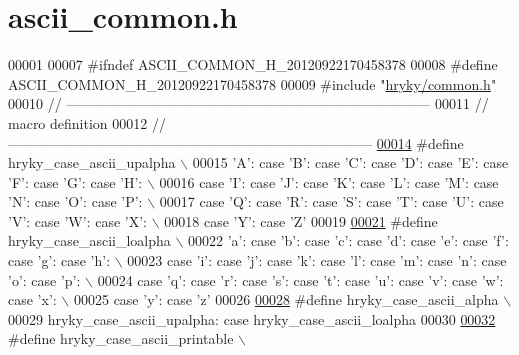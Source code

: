 \hypertarget{ascii__common_8h_source}{\section{ascii\-\_\-common.\-h}
}

\begin{DoxyCode}
00001 
00007 \textcolor{preprocessor}{#ifndef ASCII\_COMMON\_H\_20120922170458378}
00008 \textcolor{preprocessor}{}\textcolor{preprocessor}{#define ASCII\_COMMON\_H\_20120922170458378}
00009 \textcolor{preprocessor}{}\textcolor{preprocessor}{#include "\hyperlink{common_8h}{hryky/common.h}"}
00010 \textcolor{comment}{//
      ------------------------------------------------------------------------------}
00011 \textcolor{comment}{// macro definition}
00012 \textcolor{comment}{//
      ------------------------------------------------------------------------------}
\hypertarget{ascii__common_8h_source_l00014}{}\hyperlink{ascii__common_8h_af55d335795d0ce4ac4d3ab957caa9c09}{00014} \textcolor{comment}{}\textcolor{preprocessor}{#define hryky\_case\_ascii\_upalpha \(\backslash\)}
00015 \textcolor{preprocessor}{    'A': case 'B': case 'C': case 'D': case 'E': case 'F': case 'G': case 'H': 
      \(\backslash\)}
00016 \textcolor{preprocessor}{case 'I': case 'J': case 'K': case 'L': case 'M': case 'N': case 'O': case 'P':
       \(\backslash\)}
00017 \textcolor{preprocessor}{case 'Q': case 'R': case 'S': case 'T': case 'U': case 'V': case 'W': case 'X':
       \(\backslash\)}
00018 \textcolor{preprocessor}{case 'Y': case 'Z'}
00019 \textcolor{preprocessor}{}
\hypertarget{ascii__common_8h_source_l00021}{}\hyperlink{ascii__common_8h_a717df946132a61c99180b3081c67f061}{00021} \textcolor{preprocessor}{#define hryky\_case\_ascii\_loalpha \(\backslash\)}
00022 \textcolor{preprocessor}{    'a': case 'b': case 'c': case 'd': case 'e': case 'f': case 'g': case 'h': 
      \(\backslash\)}
00023 \textcolor{preprocessor}{case 'i': case 'j': case 'k': case 'l': case 'm': case 'n': case 'o': case 'p':
       \(\backslash\)}
00024 \textcolor{preprocessor}{case 'q': case 'r': case 's': case 't': case 'u': case 'v': case 'w': case 'x':
       \(\backslash\)}
00025 \textcolor{preprocessor}{case 'y': case 'z'}
00026 \textcolor{preprocessor}{}
\hypertarget{ascii__common_8h_source_l00028}{}\hyperlink{ascii__common_8h_a47d4ffa4b332a1ab083be8c783dfc747}{00028} \textcolor{preprocessor}{#define hryky\_case\_ascii\_alpha \(\backslash\)}
00029 \textcolor{preprocessor}{hryky\_case\_ascii\_upalpha: case hryky\_case\_ascii\_loalpha}
00030 \textcolor{preprocessor}{}
\hypertarget{ascii__common_8h_source_l00032}{}\hyperlink{ascii__common_8h_a421999a0fac019126ceb8ca958a0d968}{00032} \textcolor{preprocessor}{#define hryky\_case\_ascii\_printable \(\backslash\)}

\end{DoxyCode}
